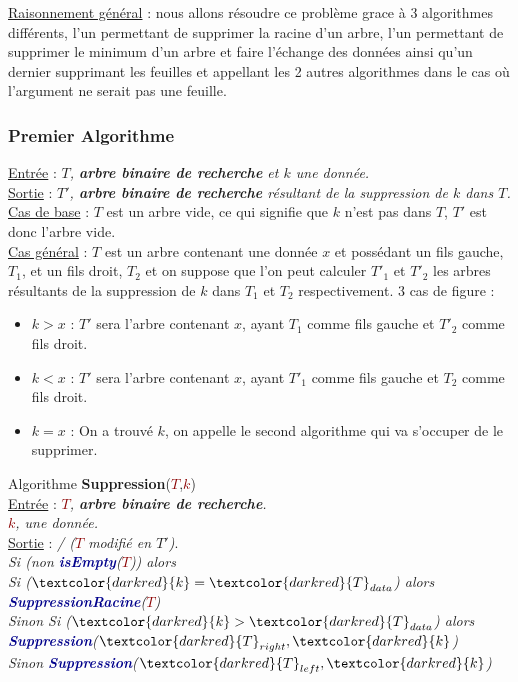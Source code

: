 \documentclass{article}
\newcommand{\abr}{\textbf{arbre binaire de recherche }}
\newcommand{\abrb}{\textbf{arbre binaire de recherche}}
\newcommand{\algo}[1]{\textcolor{darkblue}{\textbf{#1}}}
\newcommand{\param}[1]{\textcolor{darkred}{#1}}
\begin{document}
\noindent\underline{Raisonnement général} : nous allons résoudre ce problème grace à 3 algorithmes différents, l'un permettant de
supprimer la racine d'un arbre, l'un permettant de supprimer le minimum d'un arbre et faire l'échange des données ainsi
qu'un dernier supprimant les feuilles et appellant les 2 autres algorithmes dans le cas où l'argument ne serait pas une
feuille.

\subsubsection{Premier Algorithme}

\noindent\underline{Entrée} : \textit{$T$, \abr et $k$ une donnée.} \\
\underline{Sortie} : \textit{$T'$, \abr résultant de la suppression de $k$ dans $T$.} \\

\noindent \underline{Cas de base} : $T$ est un arbre vide, ce qui signifie que $k$ n'est pas dans $T$, $T'$ est donc l'arbre
vide. \\
\noindent \underline{Cas général} : $T$ est un arbre contenant une donnée $x$ et possédant un fils gauche, $T_1$, et un fils
droit, $T_2$ et on suppose que l'on peut calculer $T'_1$ et $T'_2$ les arbres résultants de la suppression de $k$ dans $T_1$
et $T_2$ respectivement. 3 cas de figure : 

\begin{itemize}
\item $k>x$ : $T'$ sera l'arbre contenant $x$, ayant $T_1$ comme fils gauche et $T'_2$ comme fils droit.
\item $k<x$ : $T'$ sera l'arbre contenant $x$, ayant $T'_1$ comme fils gauche et $T_2$ comme fils droit.
\item $k=x$ : On a trouvé $k$, on appelle le second algorithme qui va s'occuper de le supprimer. \\
\end{itemize}

\noindent Algorithme \textbf{Suppression}(\param{$T$},\param{$k$}) \\
\underline{Entrée} : \textit{\param{$T$}, \abrb.} \\
\indent\indent  \textit{\textcolor{darkred}{$k$}, une donnée.} \\
\underline{Sortie} : \textit{/ (\param{$T$} modifié en \textbf{$T'$})}.\\
\textit
{
Si (non \algo{isEmpty}(\param{$T$})) alors \\
\indent Si ($\param{k}=\param{T}_{data}$) alors \algo{SuppressionRacine}(\param{$T$}) \\
\indent Sinon Si ($\param{k}>\param{T}_{data}$) alors 
\algo{Suppression}($\param{T}_{right},\param{k}$) \\
\indent\indent\indent Sinon \algo{Suppression}($\param{T}_{left},\param{k}$) \\
} 
\end{document}
